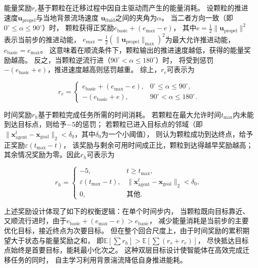能量奖励$r_e$基于颗粒在迁移过程中因自主驱动而产生的能量消耗。
设颗粒的推进速度$\mathbf{u}_{\text{propel}}$与当地背景流场速度
$\mathbf{u}_{\text{fluid}}$之间的夹角为$\alpha$。
当二者方向一致（即$0^{\circ} \leq \alpha \leq 90^{\circ}$）时，
颗粒获得正奖励$e_{\text{basic}} + (e_{\max} - e)$，
其中$e = \frac{1}{2}\|\mathbf{u}_{\text{propel}}\|^2$表示当前步的推进动能，
$e_{\max} = \frac{1}{2}(\|\mathbf{u}_{\text{propel}}\|_{\max})^2$为最大允许推进动能，
$e_{\text{basic}} = e_{\max}$。
这意味着在顺流条件下，颗粒输出的推进速度越低，获得的能量奖励越高。
反之，当颗粒逆流行进（$90^{\circ} < \alpha \leq 180^{\circ}$）时，
将受到惩罚$-(e_{\text{basic}} + e)$，推进速度越高则惩罚越重。
综上，$r_e$可表示为

\begin{equation}
    r_e = \begin{cases}
        e_{\text{basic}} + (e_{\max} - e), &
        0^{\circ} \leq \alpha \leq 90^{\circ},\\
        -(e_{\text{basic}} + e), &
        90^{\circ} < \alpha \leq 180^{\circ}.
    \end{cases}
    \label{eq:energy_reward}
\end{equation}

时间奖励$r_h$基于颗粒完成任务所需的时间消耗。
若颗粒在最大允许时间$t_{\max}$内未能到达目标点，则给予$-5$的惩罚；
若颗粒已进入目标点的邻域（即$\|\mathbf{x}_{\text{agent}}^{t} -
\mathbf{x}_{\text{goal}}\|_2 < \delta_0$，其中$\delta_0$为一个小阈值），
则认为颗粒成功到达终点，给予正奖励$\varepsilon(t_{\max} - t)$，
该奖励与剩余可用时间成正比，颗粒到达得越早奖励越高；
其余情况奖励为零。因此$r_h$可表示为

\begin{equation}
    r_h = \begin{cases}
        -5, & t \geq t_{\max},\\
        \varepsilon(t_{\max} - t), &
        \|\mathbf{x}_{\text{agent}}^{t} - \mathbf{x}_{\text{goal}}\|_2 < \delta_0,\\
        0, & \text{其他}.
    \end{cases}
    \label{eq:time_reward}
\end{equation}

上述奖励设计体现了如下的权衡逻辑：在单个时间步内，
当颗粒既向目标靠近、又顺流行进时，由于$e_{\text{basic}} + (e_{\max} - e) > e_{\text{basic}}$，
减少能量消耗是当前步的主要优化目标，接近终点为次要目标。
但在整个回合尺度上，由于时间奖励的累积期望大于状态与能量奖励之和，
即$\mathbb{E}[\sum r_h] > \mathbb{E}[\sum (r_s + r_e)]$，
尽快抵达目标点始终是首要目标，能耗最小化次之。
这种双层目标设计使智能体在高效完成迁移任务的同时，
自主学习利用背景湍流降低自身推进能耗。

